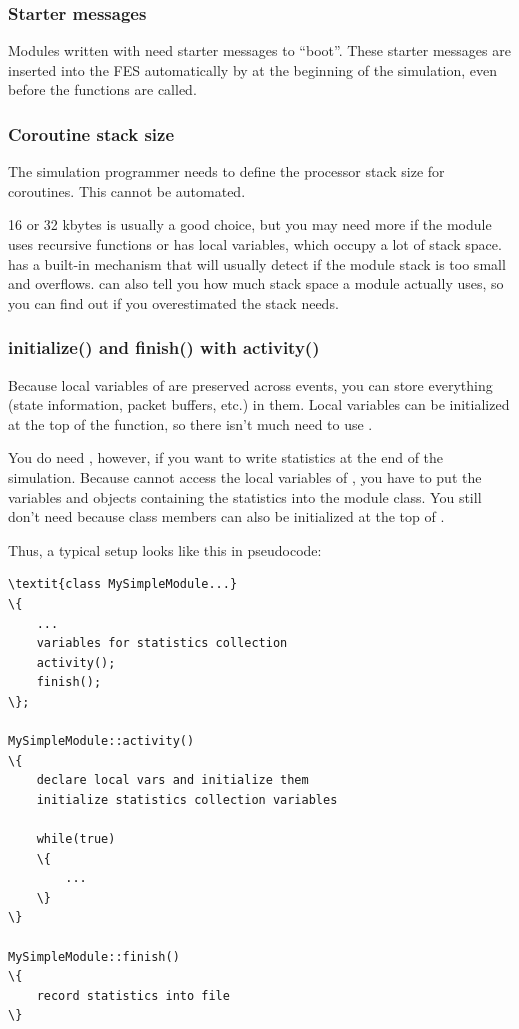 \subsubsection{Starter messages}


Modules written with  need starter
messages to ``boot''.  These starter messages
are inserted into the FES automatically by {\opp} at the
beginning of the simulation, even before the 
functions are called.


\subsubsection{Coroutine stack size}


The simulation programmer needs to define the processor stack size
for coroutines. This cannot be automated.

16 or 32 kbytes is usually a good choice, but you may need more if the
module uses recursive functions or has local variables, which occupy a
lot of stack space. {\opp} has a built-in mechanism that will usually
detect if the module stack is too small and overflows.
{\opp} can also tell you how much stack space a module actually uses,
so you can find out if you overestimated the stack needs.


\subsubsection{initialize() and finish() with activity()}


Because local variables of  are preserved across
events, you can store everything (state information, packet buffers,
etc.) in them. Local variables can be initialized at the top of the
 function, so there isn't much need to use
.


You do need , however, if you want to write statistics at
the end of the simulation. Because  cannot access
the local variables of , you have to put the variables
and objects containing the statistics into the module class.
You still don't need  because class members can also
be initialized at the top of .


Thus, a typical setup looks like this in pseudocode:


\begin{Verbatim}[commandchars=\\\{\}]
\textit{class MySimpleModule...}
\{
    ...
    variables for statistics collection
    activity();
    finish();
\};

MySimpleModule::activity()
\{
    declare local vars and initialize them
    initialize statistics collection variables

    while(true)
    \{
        ...
    \}
\}

MySimpleModule::finish()
\{
    record statistics into file
\}
\end{Verbatim}


